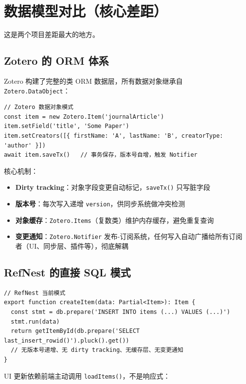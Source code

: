 \documentclass[12pt, a4paper]{article}
\begin{document}
\section{数据模型对比（核心差距）}

这是两个项目差距最大的地方。

\subsection{Zotero 的 ORM 体系}

Zotero 构建了完整的类 ORM 数据层，所有数据对象继承自 \texttt{Zotero.DataObject}：

\begin{lstlisting}[language={}]
// Zotero 数据对象模式
const item = new Zotero.Item('journalArticle')
item.setField('title', 'Some Paper')
item.setCreators([{ firstName: 'A', lastName: 'B', creatorType: 'author' }])
await item.saveTx()   // 事务保存，版本号自增，触发 Notifier
\end{lstlisting}

核心机制：
\begin{itemize}[leftmargin=2em, itemsep=2pt]
  \item \textbf{Dirty tracking}：对象字段变更自动标记，\texttt{saveTx()} 只写脏字段
  \item \textbf{版本号}：每次写入递增 \texttt{version}，供同步系统做冲突检测
  \item \textbf{对象缓存}：\texttt{Zotero.Items}（复数类）维护内存缓存，避免重复查询
  \item \textbf{变更通知}：\texttt{Zotero.Notifier} 发布-订阅系统，任何写入自动广播给所有订阅者（UI、同步层、插件等），彻底解耦
\end{itemize}

\subsection{RefNest 的直接 SQL 模式}

\begin{lstlisting}[language={}]
// RefNest 当前模式
export function createItem(data: Partial<Item>): Item {
  const stmt = db.prepare('INSERT INTO items (...) VALUES (...)')
  stmt.run(data)
  return getItemById(db.prepare('SELECT last_insert_rowid()').pluck().get())
  // 无版本号递增、无 dirty tracking、无缓存层、无变更通知
}
\end{lstlisting}

UI 更新依赖前端主动调用 \texttt{loadItems()}，不是响应式：
\end{document}
